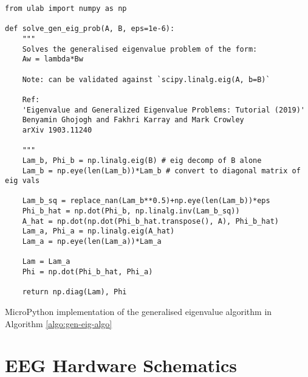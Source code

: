 \begin{listing}[!htb]
\small
\begin{verbatim}
from ulab import numpy as np

def solve_gen_eig_prob(A, B, eps=1e-6):
    """
    Solves the generalised eigenvalue problem of the form:
    Aw = lambda*Bw
    
    Note: can be validated against `scipy.linalg.eig(A, b=B)`
    
    Ref: 
    'Eigenvalue and Generalized Eigenvalue Problems: Tutorial (2019)'
    Benyamin Ghojogh and Fakhri Karray and Mark Crowley
    arXiv 1903.11240

    """
    Lam_b, Phi_b = np.linalg.eig(B) # eig decomp of B alone
    Lam_b = np.eye(len(Lam_b))*Lam_b # convert to diagonal matrix of eig vals
    
    Lam_b_sq = replace_nan(Lam_b**0.5)+np.eye(len(Lam_b))*eps
    Phi_b_hat = np.dot(Phi_b, np.linalg.inv(Lam_b_sq))
    A_hat = np.dot(np.dot(Phi_b_hat.transpose(), A), Phi_b_hat)
    Lam_a, Phi_a = np.linalg.eig(A_hat)
    Lam_a = np.eye(len(Lam_a))*Lam_a
    
    Lam = Lam_a
    Phi = np.dot(Phi_b_hat, Phi_a)
    
    return np.diag(Lam), Phi

\end{verbatim}
\caption{MicroPython implementation of the generalised eigenvalue algorithm in Algorithm \ref{algo:gen-eig-algo}}
\label{app-listing:gen-eig-prob-mpy}
\end{listing}

\section{EEG Hardware Schematics}

\label{appendix:schematics}
